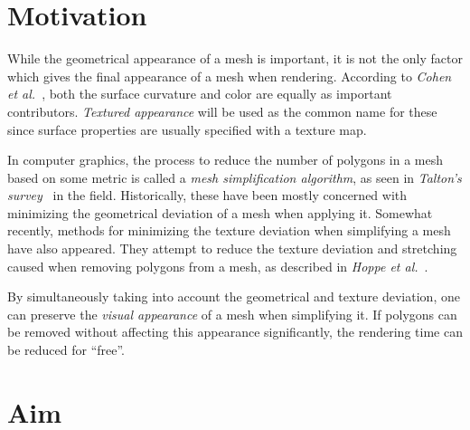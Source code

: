 \section{Motivation}
\label{sec:motivation}

While the geometrical appearance of a mesh is important, it is not the only factor which gives the final appearance of a mesh when rendering. According to \emph{Cohen et al.}~\cite{cohen1998appearance}, both the surface curvature and color are equally as important contributors. \emph{Textured appearance} will be used as the common name for these since surface properties are usually specified with a texture map.

In computer graphics, the process to reduce the number of polygons in a mesh based on some metric is called a \emph{mesh simplification algorithm}, as seen in \emph{Talton's survey}~\cite{talton2004short} in the field. Historically, these have been mostly concerned with minimizing the geometrical deviation of a mesh when applying it. Somewhat recently, methods for minimizing the texture deviation when simplifying a mesh have also appeared. They attempt to reduce the texture deviation and stretching caused when removing polygons from a mesh, as described in \emph{Hoppe et al.}~\cite{hoppe1996progressive}.

By simultaneously taking into account the geometrical and texture deviation, one can preserve the \emph{visual appearance} of a mesh when simplifying it. If polygons can be removed without affecting this appearance significantly, the rendering time can be reduced for ``free''.

\section{Aim}
\label{sec:aim}

\iffalse %
To survey the field for state-of-the-art mesh simplification algorithms that preserve the visual appearance of a mesh, and integrate these into \emph{Configura's} (see Section~\ref{sec:background}) graphics pipeline. This will enable Configura to generate better \emph{Level of Detail} (LoD) meshes for speeding up their rendering time. Currently, Configura only takes the geometrical deviation into account when simplifying, with no regard for the textures (e.g. diffuse or normal) applied to the mesh.

Thereafter, we plan to evaluate each of these solutions by measuring their performance and ability to preserve the meshes' original appearance. In the end, the goal is to find the mesh simplification algorithm which both performs and preserves the mesh appearance well.
\fi %

